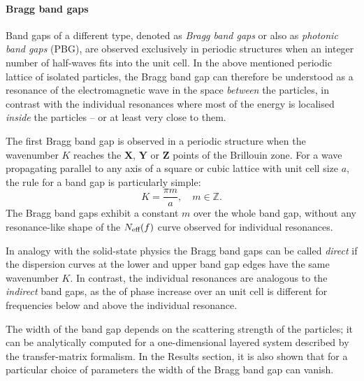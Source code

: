 \paragraph{Bragg band gaps} %
Band gaps of a different type, denoted as \textit{Bragg band gaps} or also as \textit{photonic band gaps} (PBG), are observed exclusively in periodic structures when an integer number of half-waves fits into the unit cell. 
In the above mentioned periodic lattice of isolated particles, the Bragg band gap can therefore be understood as a resonance of the electromagnetic wave in the space \textit{between} the particles, in contrast with the individual resonances where most of the energy is localised \textit{inside} the particles -- or at least very close to them.

The first Bragg band gap is observed in a periodic structure when the wavenumber $K$ reaches the $\mathbf X$, $\mathbf Y$ or $\mathbf Z$ points of the Brillouin zone. For a wave propagating parallel to any axis of a square or cubic lattice with unit cell size $a$, the rule for a band gap is particularly simple:
\begin{equation} K= \frac{\pi m}{a},\quad m\in\mathbb{Z}.  \label{eq_braggbg}\end{equation}
The Bragg band gaps exhibit a constant $m$ over the whole band gap, without any resonance-like shape of the $N_{\text{eff} }(f)$ %
curve observed for individual resonances. 

In analogy with the solid-state physics the Bragg band gaps can be called \textit{direct} if the dispersion curves at the lower and upper band gap edges have the same wavenumber $K$.  In contrast, the individual resonances are analogous to the \textit{indirect} band gaps, as the of phase increase over an unit cell is different  for frequencies below and above the individual resonance. 

The width of the band gap depends on the scattering strength of the particles; it can be analytically computed for a one-dimensional layered system \cite{laktionov2008} described by the transfer-matrix formalism. 
In the Results section, it is also shown that for a particular choice of parameters the width of the Bragg band gap can vanish. 

